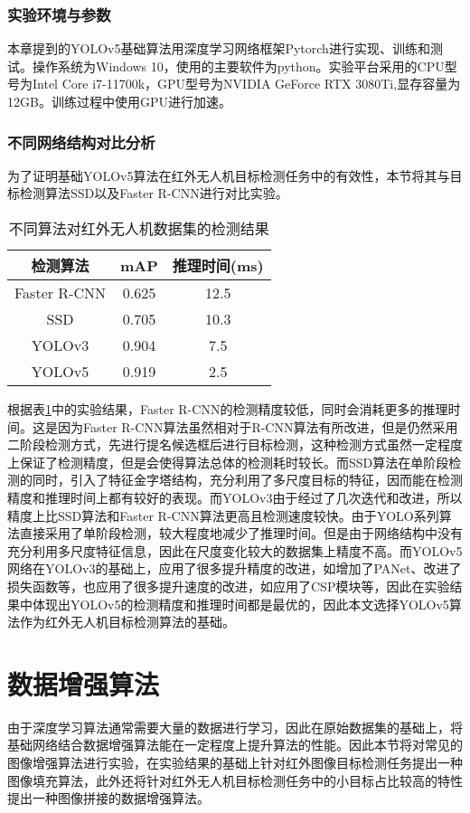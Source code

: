 \subsubsection{实验环境与参数}
本章提到的YOLOv5基础算法用深度学习网络框架Pytorch进行实现、训练和测试。操作系统为Windows 10，使用的主要软件为python。实验平台采用的CPU型号为Intel Core i7-11700k，GPU型号为NVIDIA GeForce RTX 3080Ti,显存容量为12GB。训练过程中使用GPU进行加速。

\subsubsection{不同网络结构对比分析}
为了证明基础YOLOv5算法在红外无人机目标检测任务中的有效性，本节将其与目标检测算法SSD以及Faster R-CNN进行对比实验。

\begin{table}[htbp]
  \caption{不同算法对红外无人机数据集的检测结果}
  \vspace{0.5em}\centering\wuhao
  \begin{tabular}{ccc}
  \toprule
  检测算法 & mAP & 推理时间(ms)\\
  \midrule
  Faster R-CNN & 0.625 & 12.5\\
  SSD & 0.705 & 10.3\\
  YOLOv3 & 0.904 & 7.5\\
  YOLOv5 & 0.919 & 2.5\\
  \bottomrule
  \end{tabular}
  \label{t11}
\end{table}

根据表\ref{t11}中的实验结果，Faster R-CNN的检测精度较低，同时会消耗更多的推理时间。这是因为Faster R-CNN算法虽然相对于R-CNN算法有所改进，但是仍然采用二阶段检测方式，先进行提名候选框后进行目标检测，这种检测方式虽然一定程度上保证了检测精度，但是会使得算法总体的检测耗时较长。而SSD算法在单阶段检测的同时，引入了特征金字塔结构，充分利用了多尺度目标的特征，因而能在检测精度和推理时间上都有较好的表现。而YOLOv3由于经过了几次迭代和改进，所以精度上比SSD算法和Faster R-CNN算法更高且检测速度较快。由于YOLO系列算法直接采用了单阶段检测，较大程度地减少了推理时间。但是由于网络结构中没有充分利用多尺度特征信息，因此在尺度变化较大的数据集上精度不高。而YOLOv5网络在YOLOv3的基础上，应用了很多提升精度的改进，如增加了PANet、改进了损失函数等，也应用了很多提升速度的改进，如应用了CSP模块等，因此在实验结果中体现出YOLOv5的检测精度和推理时间都是最优的，因此本文选择YOLOv5算法作为红外无人机目标检测算法的基础。

\section{数据增强算法}
由于深度学习算法通常需要大量的数据进行学习，因此在原始数据集的基础上，将基础网络结合数据增强算法能在一定程度上提升算法的性能。因此本节将对常见的图像增强算法进行实验，在实验结果的基础上针对红外图像目标检测任务提出一种图像填充算法，此外还将针对红外无人机目标检测任务中的小目标占比较高的特性提出一种图像拼接的数据增强算法。

